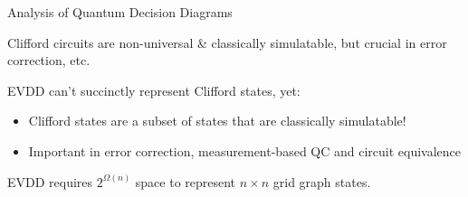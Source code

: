 \begin{refframe}{Analysis of Quantum Decision Diagrams}

\centering
{}	

\alert{Clifford circuits are non-universal \& classically simulatable, but crucial in error correction, etc.}

\pause


\begin{alertblock}{EVDD can't succinctly represent Clifford states, yet:}
	\begin{itemize}
		\item Clifford states are a subset of states that are \alert{classically simulatable!}
		\item Important in error correction, measurement-based QC and circuit equivalence
	\end{itemize}
\end{alertblock}


\begin{theorem}
EVDD requires $2^{\Omega({{n}})}$ space to represent 
	$ n\times  n$ grid graph states.
\end{theorem}



\end{refframe}
